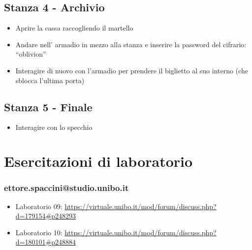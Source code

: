 \documentclass[a4paper,12pt]{report}
\begin{document}
\section{Stanza 4 - Archivio}
\begin{itemize}
	\item Aprire la cassa raccogliendo il martello
	\item Andare nell’ armadio in mezzo alla stanza e inserire la password del cifrario: “oblivion” 
	\item Interagire di nuovo con l’armadio per prendere il biglietto al suo interno (che sblocca l’ultima porta) 
\end{itemize}
%
\section{Stanza 5 - Finale}
\begin{itemize}
	\item Interagire con lo specchio
\end{itemize}

\appendix
\chapter{Esercitazioni di laboratorio}

 
\subsection{ettore.spaccini@studio.unibo.it}

\begin{itemize}
 \item Laboratorio 09: \url{https://virtuale.unibo.it/mod/forum/discuss.php?d=179154#p248293}
 \item Laboratorio 10: \url{https://virtuale.unibo.it/mod/forum/discuss.php?d=180101#p248884}
\end{itemize}





\end{document}
